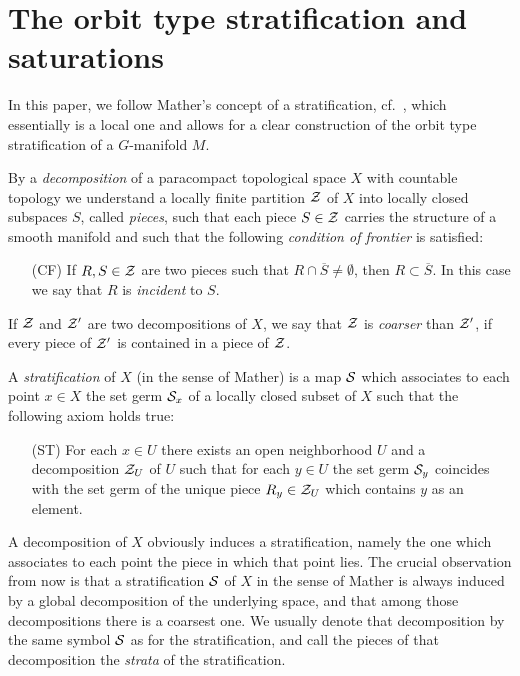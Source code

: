 %
%
\section{The orbit type stratification and saturations}
\label{orbittypestratification}
%
%
In this paper, we follow Mather's concept of a stratification, 
cf.~\cite{MatSM,PflAGSSS}, which essentially is a local one and allows for a 
clear construction of the orbit type stratification 
of a $G$-manifold $M$.

\begin{definition}
By a \emph{decomposition} of a paracompact topological space $X$ with countable topology we understand a locally finite 
partition $\mathcal{Z}$ of $X$ into locally closed subspaces $S$, 
called \emph{pieces}, such that each piece $S\in \mathcal{Z}$ carries
the structure of a smooth manifold and such that the following \emph{condition of frontier} is satisfied:
\begin{enumerate}
\item[(CF)] 
  If $R,S \in \mathcal{Z}$ are two pieces such that $R \cap \overline{S} \neq \emptyset$, then $R \subset \overline{S}$. 
  In this case we say that $R$ is \emph{incident} to $S$. 
\end{enumerate}
If $\mathcal{Z}$ and $\mathcal{Z}'$ are two decompositions of $X$, we say that 
$\mathcal{Z}$ is \emph{coarser} than $\mathcal{Z}'$, if every piece of $\mathcal{Z}'$ is
contained in a piece of  $\mathcal{Z}$. 

A \emph{stratification}  of $X$ (in the sense of Mather)
is a map $\mathcal{S}$ which associates to each 
point $x\in X$ the set germ $\mathcal{S}_x$ of a locally closed subset of $X$ 
such that the following axiom holds true:
\begin{enumerate}
\item[(ST)] For each $x \in U$ there exists an open neighborhood $U$ and a 
  decomposition $\mathcal{Z}_U$ of $U$ such that for each $y\in U$ the set germ 
  $\mathcal{S}_y$ coincides with the set germ of the unique piece $R_y \in \mathcal{Z}_U$ 
  which contains $y$ as an element. 
\end{enumerate}
\end{definition}

A decomposition of $X$ obviously induces a stratification, namely the one 
which associates to each point the piece in which that point lies. 
The crucial observation from \cite[Prop.~1.2.7]{PflAGSSS} now is that a 
stratification $\mathcal{S}$ of $X$ in the sense of Mather is always induced by a 
global decomposition of the underlying space, and that among those 
decompositions there is a coarsest one. We usually denote that 
decomposition by the same symbol $\mathcal{S}$ as for the stratification, and call 
the pieces of that decomposition the \emph{strata} of the stratification. 

